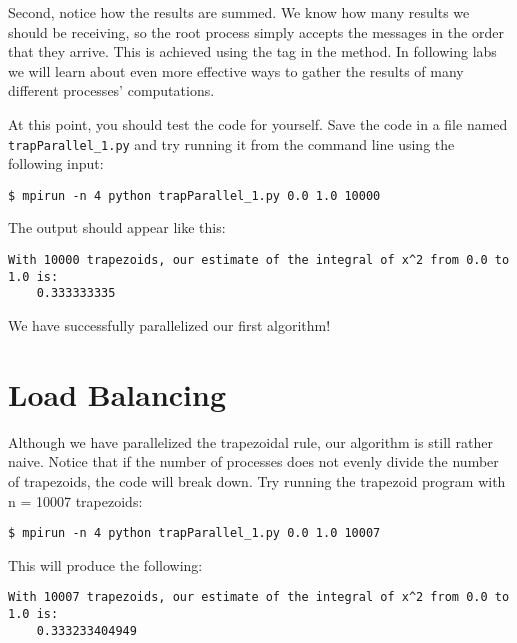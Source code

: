 Second, notice how the results are summed. We know how many results we should be receiving, so the root process simply accepts the messages in the order that they arrive. This is achieved using the tag  in the  method. In following labs we will learn about even more effective ways to gather the results of many different processes' computations.


At this point, you should test the code for yourself. Save the code in a file named \texttt{trapParallel\_1.py} and try running it from the command line using the following input: 
\begin{lstlisting}[style=ShellInput]
$ mpirun -n 4 python trapParallel_1.py 0.0 1.0 10000
\end{lstlisting}
The output should appear like this:
\begin{lstlisting}[style=ShellOutput]
With 10000 trapezoids, our estimate of the integral of x^2 from 0.0 to 1.0 is:
    0.333333335
\end{lstlisting}
We have successfully parallelized our first algorithm!


\section*{Load Balancing}
Although we have parallelized the trapezoidal rule, our algorithm is still rather naive. Notice that if the number of processes does not evenly divide the number of trapezoids, the code will break down. Try running the trapezoid program with n = 10007 trapezoids:
\begin{lstlisting}[style=ShellInput]
$ mpirun -n 4 python trapParallel_1.py 0.0 1.0 10007
\end{lstlisting}
This will produce the following:
\begin{lstlisting}[style=ShellOutput]
With 10007 trapezoids, our estimate of the integral of x^2 from 0.0 to 1.0 is:
    0.333233404949
\end{lstlisting}

